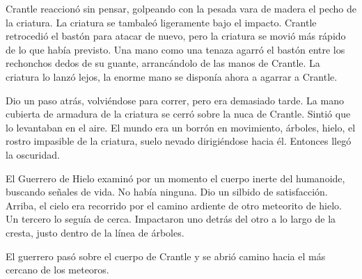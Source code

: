 Crantle reaccionó sin pensar, golpeando con la pesada vara de madera el pecho de la criatura. La criatura se tambaleó ligeramente bajo el impacto. Crantle retrocedió el bastón para atacar de nuevo, pero la criatura se movió más rápido de lo que había previsto. Una mano como una tenaza agarró el bastón entre los rechonchos dedos de su guante, arrancándolo de las manos de Crantle. La criatura lo lanzó lejos, la enorme mano se disponía ahora a agarrar a Crantle.



Dio un paso atrás, volviéndose para correr, pero era demasiado tarde. La mano cubierta de armadura de la criatura se cerró sobre la nuca de Crantle. Sintió que lo levantaban en el aire. El mundo era un borrón en movimiento, árboles, hielo, el rostro impasible de la criatura, suelo nevado dirigiéndose hacia él. Entonces llegó la oscuridad.



\mbox{}



El Guerrero de Hielo examinó por un momento el cuerpo inerte del humanoide, buscando señales de vida. No había ninguna. Dio un silbido de satisfacción. Arriba, el cielo era recorrido por el camino ardiente de otro meteorito de hielo. Un tercero lo seguía de cerca. Impactaron uno detrás del otro a lo largo de la cresta, justo dentro de la línea de árboles.



El guerrero pasó sobre el cuerpo de Crantle y se abrió camino hacia el más cercano de los meteoros.
